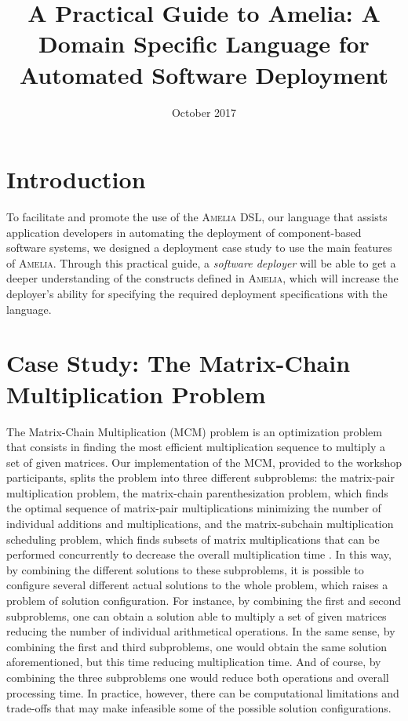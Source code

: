 \documentclass{article}
\title{A Practical Guide to Amelia: A Domain Specific Language for Automated Software Deployment}
\author{ }
\date{October 2017}
\newcommand\amelia[0]{\textsc{Amelia}}
\begin{document}
\maketitle

\section{Introduction}

To facilitate and promote the use of the \amelia{} DSL, our language that assists application developers in automating the deployment of component-based software systems, we designed a deployment case study to use the main features of \amelia{}. Through this practical guide, a \textit{software deployer} will be able to get a deeper understanding of the constructs defined in \amelia{}, which will increase the deployer's ability for specifying the required deployment specifications with the language.


\section{Case Study: The Matrix-Chain Multiplication Problem}

The Matrix-Chain Multiplication (MCM) problem is an optimization problem that consists in finding the most efficient multiplication sequence to multiply a set of given matrices. Our implementation of the MCM, provided to the workshop participants, splits the problem into three different subproblems: the matrix-pair multiplication problem, the matrix-chain parenthesization problem, which finds the optimal sequence of matrix-pair multiplications minimizing the number of individual additions and multiplications, and the matrix-subchain multiplication scheduling problem, which finds subsets of matrix multiplications that can be performed concurrently to decrease the overall multiplication time \cite{lee2003}. In this way, by combining the different solutions to these subproblems, it is possible to configure several different actual solutions to the whole problem, which raises a problem of solution configuration. For instance, by combining the first and second subproblems, one can obtain a solution able to multiply a set of given matrices reducing the number of individual arithmetical operations. In the same sense, by combining the first and third subproblems, one would obtain the same solution aforementioned, but this time reducing multiplication time. And of course, by combining the three subproblems one would reduce both operations and overall processing time. In practice, however, there can be computational limitations and trade-offs that may make infeasible some of the possible solution configurations. \\
\end{document}
